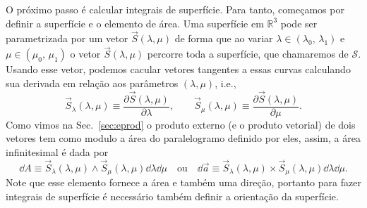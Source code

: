 O próximo passo é calcular integrais de superfície. Para tanto, começamos por
definir a superfície e o elemento de área. Uma superfície em $\mathbb{R}^3$ pode
ser parametrizada por um vetor $\vec{S}(\lambda,\mu)$ de forma que ao variar
$\lambda \in (\lambda_0,\,\lambda_1)$ e $\mu \in (\mu_0,\,\mu_1)$ o vetor
$\vec{S}(\lambda,\mu)$ percorre toda a superfície, que chamaremos de
$\mathcal{S}$. Usando esse vetor, podemos cacular vetores tangentes a essas
curvas calculando sua derivada em relação aos parâmetros $(\lambda,\mu)$, i.e.,
\begin{equation}\label{def:S}
	\vec{S}_\lambda(\lambda,\mu) \equiv \frac{\partial \vec{S}(\lambda,\mu)}{\partial\lambda}, \qquad \vec{S}_\mu(\lambda,\mu) \equiv \frac{\partial \vec{S}(\lambda,\mu)}{\partial\mu}.
\end{equation}
Como vimos na Sec.~\ref{sec:eprod} o produto externo (e o produto vetorial)
de dois vetores tem como modulo a área do paralelogramo definido por eles,
assim, a área infinitesimal é dada por
\begin{equation}
	\dd A \equiv \vec{S}_\lambda(\lambda,\mu)\wedge\vec{S}_\mu(\lambda,\mu)\dd \lambda\dd \mu \quad\text{ou}\quad \dd \vec{a} \equiv \vec{S}_\lambda(\lambda,\mu)\times\vec{S}_\mu(\lambda,\mu)\dd \lambda\dd \mu.
\end{equation}
Note que esse elemento fornece a área e também uma direção, portanto para fazer
integrais de superfície é necessário também definir a orientação da superfície.


